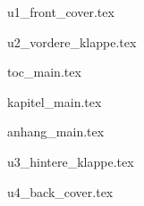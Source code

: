 \documentclass{schoolbook}
\begin{document}
{u1_front_cover.tex}

{u2_vordere_klappe.tex}

{toc_main.tex}

{kapitel_main.tex}

{anhang_main.tex}

{u3_hintere_klappe.tex}

{u4_back_cover.tex}
	
\end{document}
